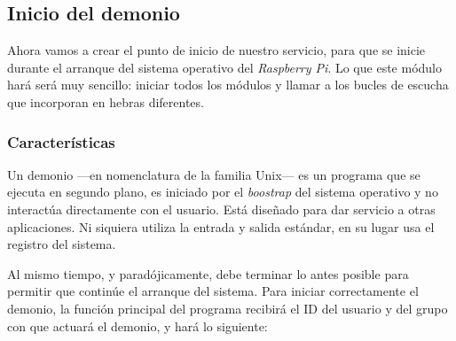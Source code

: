 \subsection{Inicio del demonio}

Ahora vamos a crear el punto de inicio de nuestro servicio, para que se inicie durante el arranque del sistema operativo del \textit{Raspberry Pi}. Lo que este módulo hará será muy sencillo: iniciar todos los módulos y llamar a los bucles de escucha que incorporan en hebras diferentes.

\subsubsection{Características}

Un demonio ---en nomenclatura de la familia Unix--- es un programa que se ejecuta en segundo plano, es iniciado por el \textit{boostrap} del sistema operativo y no interactúa directamente con el usuario. Está diseñado para dar servicio a otras aplicaciones. Ni siquiera utiliza la entrada y salida estándar, en su lugar usa el registro del sistema.

Al mismo tiempo, y paradójicamente, debe terminar lo antes posible para permitir que continúe el arranque del sistema. Para iniciar correctamente el demonio, la función principal del programa recibirá el ID del usuario y del grupo con que actuará el demonio, y hará lo siguiente: \cite{shahmir_daemon}

